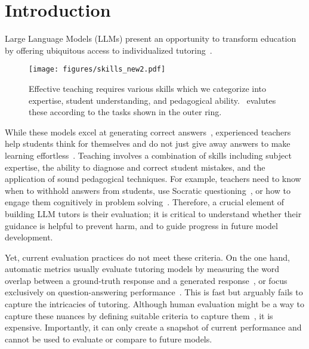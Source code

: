 \section{Introduction}
Large Language Models (LLMs) present an opportunity to transform education by offering ubiquitous access to individualized tutoring~\citep{jurenka2024towards}.
\begin{figure}[ht]
    \centering
    \texttt{[image: figures/skills\_new2.pdf]}
    \caption{
    Effective teaching requires various skills which we categorize into expertise, student understanding, and pedagogical ability. \mathtutorbench\ evalutes these according to the tasks shown in the outer ring.
    }
    \label{fig:skills-figure}
\end{figure}
While these models excel at generating correct answers~\cite{wei2022chain,achiam2023gpt}, experienced teachers 
help students think for themselves and do not just give away answers to make learning effortless~\cite{sharma2024towards}.
Teaching involves a combination of skills including subject expertise, the ability to diagnose and correct student mistakes, and the application of sound pedagogical techniques. For example, teachers need to know when to withhold answers from students, use Socratic questioning~\cite{anghileri2006scaffolding}, or how to engage them cognitively in problem solving~\cite{chi2014icap,kapur2016examining}.
Therefore, a crucial element of building LLM tutors is their evaluation; it is critical to understand whether their guidance is helpful to prevent harm, and to guide progress in future model development.

Yet, current evaluation practices do not meet these criteria.
On the one hand, automatic metrics usually evaluate tutoring models by measuring the word overlap between a ground-truth response and a generated response~\cite{beasharedtask2023}, or focus exclusively on question-answering performance~\cite{tutorchat24}. This is fast but arguably fails to capture the intricacies of tutoring.
Although human evaluation might be a way to capture these nuances by defining suitable criteria to capture them~\citep{tack2022ai,mrbench2024}, it is expensive. %
Importantly, it can only create a snapshot of current performance and cannot be used to evaluate or compare to future models. 


